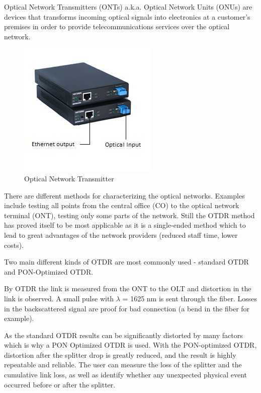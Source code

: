 Optical Network Transmitters (ONTs) a.k.a. Optical Network Units (ONUs) are devices that transforms incoming optical signals into electronics at a customer's premises in order to provide telecommunications services over the optical network.
\begin{figure}%
\centering
\includegraphics[width=.4\columnwidth]{grafiken/onu.jpg}%
\caption{Optical Network Transmitter}%
\label{}%
\end{figure}

There are different methods for characterizing the optical networks. Examples include testing all points from the central office (CO) to the optical network terminal (ONT), testing only some parts of the network. Still the OTDR method has proved itself to be most applicable as it is a single-ended method which to lead to great advantages of the network providers (reduced staff time, lower costs).

Two main different kinds of OTDR are most commonly used - standard OTDR and PON-Optimized OTDR.

By OTDR the link is measured from the ONT to the OLT and distortion in the link is observed. A small pulse with $\lambda$ = 1625 nm is sent through the fiber. Losses in the backscattered signal are proof for bad connection (a bend in the fiber for example).

As the standard OTDR results can be significantly distorted by many factors which is why a PON Optimized OTDR is used. With the PON-optimized OTDR, distortion after the splitter drop is greatly reduced, and the result is highly repeatable and reliable. The user can measure the loss of the splitter and the cumulative link loss, as well as identify whether any unexpected physical event occurred before or after the splitter.

